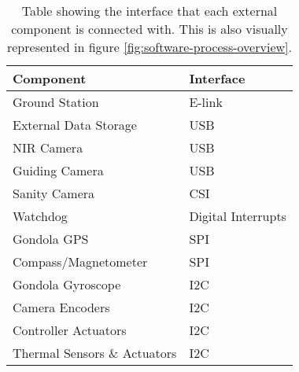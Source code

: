 \begin{table}[H]
	\centering
	\begin{tabular}{l|l}
		\textbf{Component}
		& \textbf{Interface} \\ \hline
		Ground Station
		& E-link             \\
		External Data Storage
		& USB            \\
		NIR Camera
		& USB                \\
		Guiding Camera
		& USB                \\		
		Sanity Camera
		& CSI                \\
		Watchdog
		& Digital Interrupts \\
		Gondola GPS
		& SPI                \\
		Compass/Magnetometer
		& SPI                \\
		Gondola Gyroscope
		& I2C                \\
		Camera Encoders   
		& I2C                \\
		Controller Actuators
		& I2C                \\
		Thermal Sensors \& Actuators
		& I2C
	\end{tabular}
	\caption{Table showing the interface that each external component is connected with. This is also visually represented in figure \ref{fig:software-process-overview}.}
	\label{tab:software-interfaces}
\end{table}
